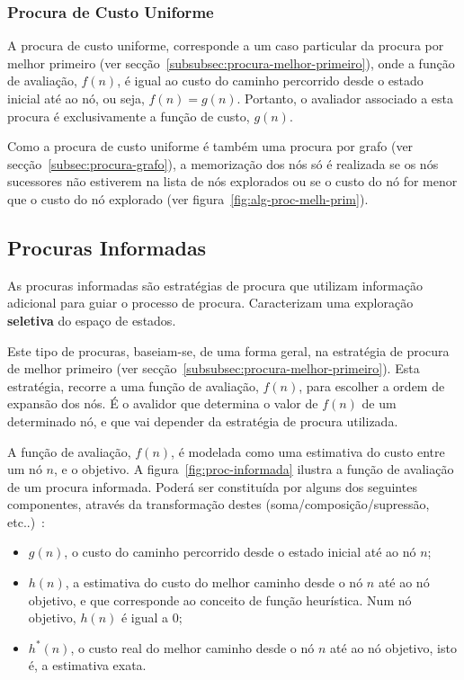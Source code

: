 \subsubsection{Procura de Custo Uniforme}\label{subsubsec:procura-custo-uniforme}

A procura de custo uniforme, corresponde a um caso particular da procura por melhor primeiro (ver secção~\ref{subsubsec:procura-melhor-primeiro}), onde a função de avaliação, $f(n)$, é igual ao custo do caminho percorrido desde o estado inicial até ao nó, ou seja, $f(n) = g(n)$. Portanto, o avaliador associado a esta procura é exclusivamente a função de custo, $g(n)$.

Como a procura de custo uniforme é também uma procura por grafo (ver secção~\ref{subsec:procura-grafo}), a memorização dos nós só é realizada se os nós sucessores não estiverem na lista de nós explorados ou se o custo do nó for menor que o custo do nó explorado (ver figura~\ref{fig:alg-proc-melh-prim}).

\subsection{Procuras Informadas}\label{subsec:procuras-informadas}

As procuras informadas são estratégias de procura que utilizam informação adicional para guiar o processo de procura.
Caracterizam uma exploração \textbf{seletiva} do espaço de estados.

Este tipo de procuras, baseiam-se, de uma forma geral, na estratégia de procura de melhor primeiro (ver secção~\ref{subsubsec:procura-melhor-primeiro}).
Esta estratégia, recorre a uma função de avaliação, $f(n)$, para escolher a ordem de expansão dos nós. É o avalidor que determina o valor de $f(n)$ de um determinado nó, e que vai depender da estratégia de procura utilizada.

A função de avaliação, $f(n)$, é modelada como uma estimativa do custo entre um nó $n$, e o objetivo.
A figura~\ref{fig:proc-informada} ilustra a função de avaliação de um procura informada.
Poderá ser constituída por alguns dos seguintes componentes, através da transformação destes (soma/composição/supressão, etc..)~\cite{ist:leic:resumos:procura-informada}:

\begin{itemize}
    \item $g(n)$, o custo do caminho percorrido desde o estado inicial até ao nó $n$;
    \item $h(n)$, a estimativa do custo do melhor caminho desde o nó $n$ até ao nó objetivo,
    e que corresponde ao conceito de função heurística.
    Num nó objetivo, $h(n)$ é igual a 0;
    \item $h^*(n)$, o custo real do melhor caminho desde o nó $n$ até ao nó objetivo, isto é, a estimativa exata.
\end{itemize}

